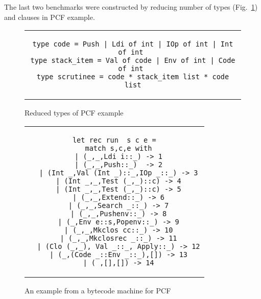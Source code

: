 The last two benchmarks were constructed by reducing number of types (Fig.~\ref{fig:pcf-reduced}) and clauses in PCF example.%

\begin{figure}%
\centering
\begin{tabular}{c} %
\begin{lstlisting}
type code = Push | Ldi of int | IOp of int | Int of int 
type stack_item = Val of code | Env of int | Code of int 
type scrutinee = code * stack_item list * code list
\end{lstlisting}
\end{tabular}
\caption{Reduced types of PCF example }
\label{fig:pcf-reduced}
\end{figure}

\begin{figure}%
\centering
\begin{tabular}{c} %
\begin{lstlisting}
let rec run  s c e =
  match s,c,e with
  | (_,_,Ldi i::_) -> 1
  | (_,_,Push::_)  -> 2
  | (Int _,Val (Int _)::_,IOp _::_) -> 3
  | (Int _,_,Test (_,_)::c) -> 4
  | (Int _,_,Test (_,_)::c) -> 5
  | (_,_,Extend::_) -> 6
  | (_,_,Search _::_) -> 7
  | (_,_,Pushenv::_) -> 8
  | (_,Env e::s,Popenv::_) -> 9
  | (_,_,Mkclos cc::_) -> 10
  | (_,_,Mkclosrec _::_) -> 11
  | (Clo (_,_), Val _::_, Apply::_) -> 12
  | (_,(Code _::Env _::_),[]) -> 13
  | (_,[],[]) -> 14
\end{lstlisting}
\end{tabular}
\caption{An example from a bytecode machine for PCF}
\label{fig:pcf}
\end{figure}

